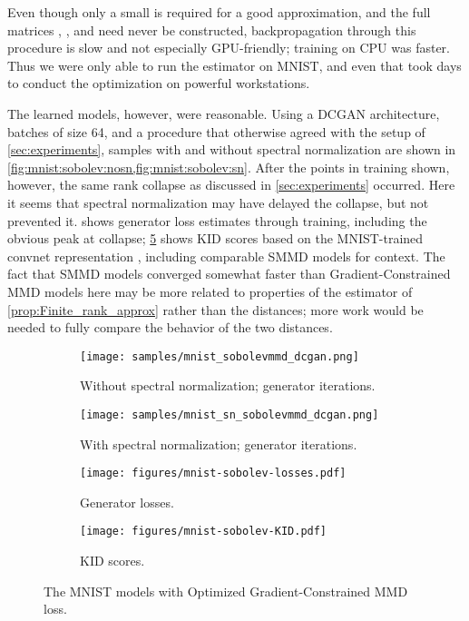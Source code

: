 \documentclass{article}
\let\citep\parencite
\begin{document}
Even though only a small  is required for a good approximation,
and the full matrices , , and  need never be constructed,
backpropagation through this procedure is slow
and not especially GPU-friendly; training on CPU was faster.
Thus we were only able to run the estimator on MNIST,
and even that took days to conduct the optimization on powerful workstations.

The learned models, however, were reasonable.
Using a DCGAN architecture,
batches of size 64,
and a procedure that otherwise agreed with the setup of \cref{sec:experiments},
samples with and without spectral normalization
are shown in \cref{fig:mnist:sobolev:nosn,fig:mnist:sobolev:sn}.
After the points in training shown, however,
the same rank collapse as discussed in \cref{sec:experiments} occurred.
Here it seems that spectral normalization may have delayed the collapse,
but not prevented it.
 shows generator loss estimates through training,
including the obvious peak at collapse;
\cref{fig:mnist:kid} shows KID scores based on the MNIST-trained convnet representation \citep{Binkowski:2018},
including comparable SMMD models for context.
The fact that SMMD models converged somewhat faster than Gradient-Constrained MMD models here
may be more related to properties of
the estimator of \cref{prop:Finite_rank_approx}
rather than the distances;
more work would be needed to fully compare the behavior of the two distances.

\begin{figure}
  \begin{subfigure}{.2\linewidth}
    \texttt{[image: samples/mnist\_sobolevmmd\_dcgan.png]}
    \caption{Without spectral normalization;  generator iterations.}
    \label{fig:mnist:sobolev:nosn}
  \end{subfigure}
  \begin{subfigure}{.2\linewidth}
    \texttt{[image: samples/mnist\_sn\_sobolevmmd\_dcgan.png]}
    \caption{With spectral normalization;  generator iterations.}
    \label{fig:mnist:sobolev:sn}
  \end{subfigure}
  \begin{subfigure}{.28\linewidth}
    \texttt{[image: figures/mnist-sobolev-losses.pdf]}
    \caption{Generator losses.}
    \label{fig:mnist:loss}
  \end{subfigure}
  \begin{subfigure}{.28\linewidth}
    \texttt{[image: figures/mnist-sobolev-KID.pdf]}
    \caption{KID scores.}
    \label{fig:mnist:kid}
  \end{subfigure}
  \caption{The MNIST models with Optimized Gradient-Constrained MMD loss.}
\end{figure}
\end{document}
